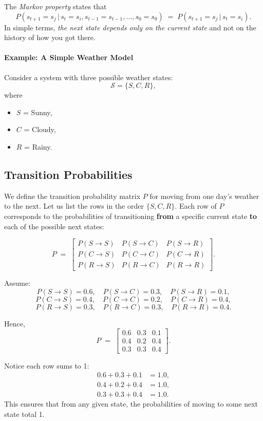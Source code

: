 The \textit{Markov property} states that 
\[
P(s_{t+1} = s_j \,\big\vert\, s_t = s_i, s_{t-1} = s_{t-1}, \dots, s_0 = s_0 )
\;=\;
P(s_{t+1} = s_j \,\big\vert\, s_t = s_i).
\]
In simple terms, \textit{the next state depends only on the current state} and not on the history of how you got there.

\paragraph{Example: A Simple Weather Model}

Consider a system with three possible weather states:
\[
\mathcal{S} = \{ S, C, R \},
\]
where
\begin{itemize}
  \item \(S\) = Sunny,
  \item \(C\) = Cloudy,
  \item \(R\) = Rainy.
\end{itemize}

\subsection{Transition Probabilities}

We define the transition probability matrix \(P\) for moving from one day's weather to the next. 
Let us list the rows in the order \(\{S, C, R\}\). 
Each row of \(P\) corresponds to the probabilities of transitioning \textbf{from} a specific current state \textbf{to} each of the possible next states:

\[
P 
\;=\;
\begin{bmatrix}
P(S \to S) & P(S \to C) & P(S \to R) \\
P(C \to S) & P(C \to C) & P(C \to R) \\
P(R \to S) & P(R \to C) & P(R \to R)
\end{bmatrix}.
\]

Assume:
\[
P(S \to S) = 0.6, \quad 
P(S \to C) = 0.3, \quad 
P(S \to R) = 0.1,
\]
\[
P(C \to S) = 0.4, \quad 
P(C \to C) = 0.2, \quad 
P(C \to R) = 0.4,
\]
\[
P(R \to S) = 0.3, \quad 
P(R \to C) = 0.3, \quad 
P(R \to R) = 0.4.
\]

Hence,
\[
P 
\;=\;
\begin{bmatrix}
0.6 & 0.3 & 0.1 \\[6pt]
0.4 & 0.2 & 0.4 \\[6pt]
0.3 & 0.3 & 0.4
\end{bmatrix}.
\]

Notice each row sums to 1:
\begin{align*}
  0.6 + 0.3 + 0.1 &= 1.0, \\
  0.4 + 0.2 + 0.4 &= 1.0, \\
  0.3 + 0.3 + 0.4 &= 1.0.
\end{align*}
This ensures that from any given state, the probabilities of moving to some next state total 1.

